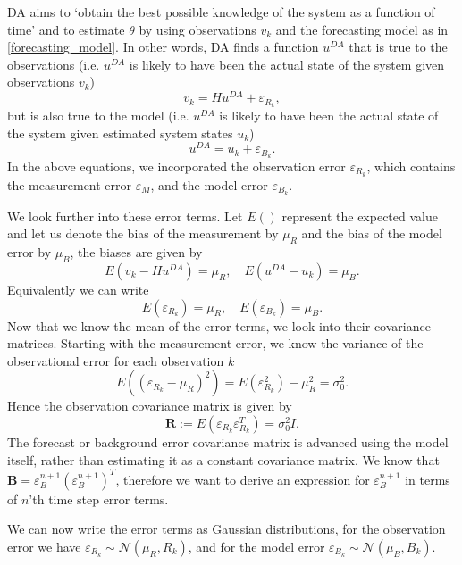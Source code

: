 \documentclass[english]{article}
\renewcommand{\epsilon}{\varepsilon}
\begin{document}
DA aims to `obtain the best possible knowledge of the system as a function of time' and to estimate $\theta$ by using observations $v_k$ and the forecasting model as in \ref{forecasting_model}.
In other words, DA finds a function $u^{DA}$ that is true to the observations (i.e. $u^{DA}$ is likely to have been the actual state of the system given observations $v_k$)
\begin{equation}
 v_k = Hu^{DA} + \epsilon_{R_k},
\end{equation}
but is also true to the model (i.e. $u^{DA}$ is likely to have been the actual state of the system given estimated system states $u_k$)
\begin{equation}
u^{DA}=u_k+\epsilon_{B_k}.
\end{equation}
In the above equations, we incorporated the observation error $\epsilon_{R_k}$, which contains the measurement error $\epsilon_M$, and the model error $\epsilon_{B_k}$. 

We look further into these error terms. Let $E()$ represent the expected value and let us denote the bias of the measurement by $\mu_R$ and the bias of the model error by $\mu_B$, the biases are given by
\begin{equation}
	E(v_k-Hu^{DA}) = \mu_R, \quad E(u^{DA}-u_k)=\mu_B.
\end{equation}
Equivalently we can write
\begin{equation}
	E(\epsilon_{R_k})=\mu_R, \quad E(\epsilon_{B_k})=\mu_B.
\end{equation}
Now that we know the mean of the error terms, we look into their covariance matrices. Starting with the measurement error, we know the variance of the observational error for each observation $k$
\begin{equation}
	E((\epsilon_{R_k}-\mu_R)^2) = E(\epsilon_{R_k}^2)-\mu_R^2 = \sigma_0^2.
\end{equation} 
Hence the observation covariance matrix is given by 
\begin{equation}
	\textbf{R} := E(\epsilon_{R_k}\epsilon_{R_k}^T) =  \sigma_0^2 I.
\end{equation}
The forecast or background error covariance matrix is advanced using the model itself, rather than estimating it as a constant covariance matrix. We know that $\textbf{B}= \epsilon_{B}^{n+1}(\epsilon_{B}^{n+1})^T$, therefore we want to derive an expression for $\epsilon^{n+1}_B$ in terms of $n$'th time step error terms.


We can now write the error terms as Gaussian distributions, for the observation error we have $\epsilon_{R_k}\sim \mathcal{N}(\mu_R, R_k)$, and for the model error $\epsilon_{B_k}\sim \mathcal{N}(\mu_B, B_k)$. 
\end{document}
